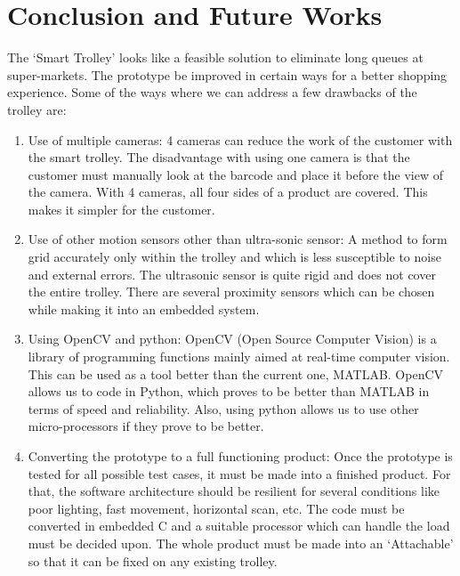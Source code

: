 \documentclass[times, 1pt, a4paper]{article}
\begin{document}
\section{Conclusion and Future Works} \label{section:conclusion}

 The ‘Smart Trolley’ looks like a feasible solution to eliminate long queues at super-markets. The prototype be improved in certain ways for a better shopping experience. Some of the ways where we can address a few drawbacks of the trolley are:

\begin{enumerate}
\item Use of multiple cameras: 4 cameras can reduce the work of the customer with the smart trolley. The disadvantage with using one camera is that the customer must manually look at the barcode and place it before the view of the camera. With 4 cameras, all four sides of a product are covered. This makes it simpler for the customer.
\item Use of other motion sensors other than ultra-sonic sensor: A method to form grid accurately only within the trolley and which is less susceptible to noise and external errors. The ultrasonic sensor is quite rigid and does not cover the entire trolley. There are several proximity sensors which can be chosen while making it into an embedded system.
\item Using OpenCV and python: OpenCV (Open Source Computer Vision) is a library of programming functions mainly aimed at real-time computer vision. This can be used as a tool better than the current one, MATLAB. OpenCV allows us to code in Python, which proves to be better than MATLAB in terms of speed and reliability. Also, using python allows us to use other micro-processors if they prove to be better.
\item Converting the prototype to a full functioning product: Once the prototype is tested for all possible test cases, it must be made into a finished product. For that, the software architecture should be resilient for several conditions like poor lighting, fast movement, horizontal scan, etc. The code must be converted in embedded C and a suitable processor which can handle the load must be decided upon. The whole product must be made into an ‘Attachable’ so that it can be fixed on any existing trolley.
\end{enumerate} 
 
 
 




\end{document}
